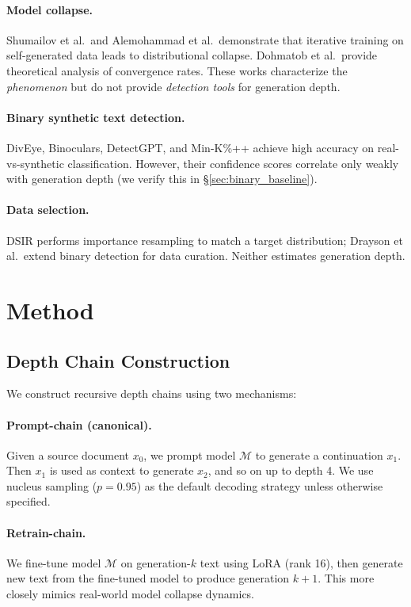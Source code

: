 \documentclass[11pt]{article}
\begin{document}
\paragraph{Model collapse.} Shumailov et al.\ and Alemohammad et al.\ demonstrate that iterative training on self-generated data leads to distributional collapse. Dohmatob et al.\ provide theoretical analysis of convergence rates. These works characterize the \emph{phenomenon} but do not provide \emph{detection tools} for generation depth.

\paragraph{Binary synthetic text detection.} DivEye, Binoculars, DetectGPT, and Min-K\%++ achieve high accuracy on real-vs-synthetic classification. However, their confidence scores correlate only weakly with generation depth (we verify this in \S\ref{sec:binary_baseline}).

\paragraph{Data selection.} DSIR performs importance resampling to match a target distribution; Drayson et al.\ extend binary detection for data curation. Neither estimates generation depth.

\section{Method}
\label{sec:method}

\subsection{Depth Chain Construction}

We construct recursive depth chains using two mechanisms:

\paragraph{Prompt-chain (canonical).} Given a source document $x_0$, we prompt model $\mathcal{M}$ to generate a continuation $x_1$. Then $x_1$ is used as context to generate $x_2$, and so on up to depth 4. We use nucleus sampling ($p=0.95$) as the default decoding strategy unless otherwise specified.

\paragraph{Retrain-chain.} We fine-tune model $\mathcal{M}$ on generation-$k$ text using LoRA (rank 16), then generate new text from the fine-tuned model to produce generation $k{+}1$. This more closely mimics real-world model collapse dynamics.
\end{document}
